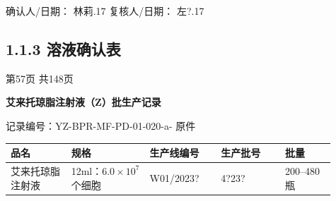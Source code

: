 \documentclass[UTF8,10pt,a4paper,fontset=fandol]{ctexart}
\newcommand{\fieldvalue}[1]{#1}
\newcommand{\handwritten}[1]{#1}
\begin{document}
\noindent
确认人/日期：
\fieldvalue{\handwritten{林莉.17}}
\hfill
复核人/日期：
\fieldvalue{\handwritten{左?.17}}

\subsection*{1.1.3 溶液确认表}

\vfill

\begin{center}
第57页 共148页
\end{center}

\newpage

\begin{center}
\textbf{艾来托琼脂注射液（Z）批生产记录}
\end{center}

\noindent
记录编号：YZ-BPR-MF-PD-01-020-a- \hfill
原件

\begin{center}
\begin{tabular}{|p{0.17\linewidth}|p{0.22\linewidth}|p{0.20\linewidth}|p{0.18\linewidth}|p{0.14\linewidth}|}
\hline
品名 & 规格 & 生产线编号 & 生产批号 & 批量\\
\hline
\fieldvalue{艾来托琼脂注射液} &
\fieldvalue{12ml：$6.0\times10^{7}$个细胞} &
\fieldvalue{\handwritten{W01/2023?}} &
\fieldvalue{\handwritten{4?23?}} &
\fieldvalue{200--480 瓶}\\
\hline
\end{tabular}
\end{center}
\end{document}

